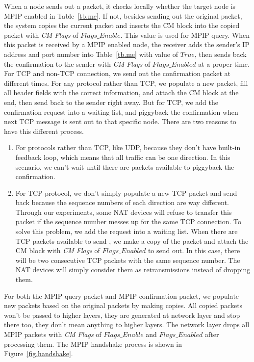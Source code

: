 When a node sends out a packet, it checks locally whether the target node is MPIP enabled in Table~\ref{tb.me}. If not, besides sending out the original packet, the system copies the current packet and inserts the CM block into the copied packet with \emph{CM Flags} of $Flags\_Enable$. This value is used for MPIP query. When this packet is received by a MPIP enabled node, the receiver adds the sender's IP address and port number into Table~\ref{tb.me} with value of $True$, then sends back the confirmation to the sender with \emph{CM Flags} of $Flags\_Enabled$ at a proper time. For TCP and non-TCP connection, we send out the confirmation packet at different times. For any protocol rather than TCP, we populate a new packet, fill all header fields with the correct information, and attach the CM block at the end, then send back to the sender right away. But for TCP, we add the confirmation request into a waiting list, and piggyback the confirmation when next TCP message is sent out to that specific node. There are two reasons to have this different process.

\begin{enumerate}
\item For protocols rather than TCP, like UDP, because they don't have built-in feedback loop, which means that all traffic can be one direction. In this scenario, we can't wait until there are packets available to piggyback the confirmation.

\item For TCP protocol, we don't simply populate a new TCP packet and send back because the sequence numbers of each direction are way different. Through our experiments, some NAT devices will refuse to transfer this packet if the sequence number messes up for the same TCP connection. To solve this problem, we add the request into a waiting list. When there are TCP packets available to send , we make a copy of the packet and attach the CM block with \emph{CM Flags} of $Flags\_Enabled$ to send out. In this case, there will be two consecutive TCP packets with the same sequence number. The NAT devices will simply consider them as retransmissions instead of dropping them.
\end{enumerate}

For both the MPIP query packet and MPIP confirmation packet, we populate new packets based on the original packets by making copies. All copied packets won't be passed to higher layers, they are generated at network layer and stop there too, they don't mean anything to higher layers. The network layer drops all MPIP packets with \emph{CM Flags} of $Flags\_Enable$ and $Flags\_Enabled$ after processing them. The MPIP handshake process is shown in Figure~\ref{fig.handshake}.

